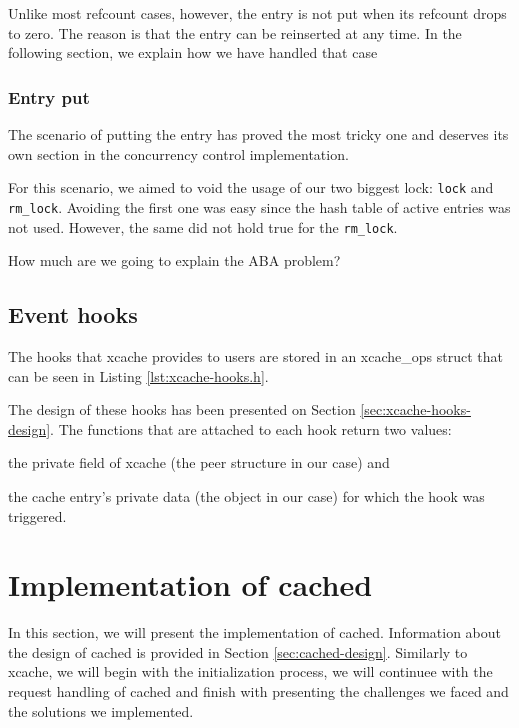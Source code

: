 Unlike most refcount cases, however, the entry is not put when its refcount 
drops to zero. The reason is that the entry can be reinserted at any time. In 
the following section, we explain how we have handled that case

\subsubsection{Entry put}

The scenario of putting the entry has proved the most tricky one and deserves 
its own section in the concurrency control implementation.

For this scenario, we aimed to void the usage of our two biggest lock: 
\texttt{lock} and \texttt{rm\_lock}. Avoiding the first one was easy since the 
hash table of active entries was not used. However, the same did not hold true 
for the \texttt{rm\_lock}.

\fixme How much are we going to explain the ABA problem?

\subsection{Event hooks}

The hooks that xcache provides to users are stored in an xcache\_ops struct 
that can be seen in Listing \ref{lst:xcache-hooks.h}.


The design of these hooks has been presented on Section 
\ref{sec:xcache-hooks-design}. The functions that are attached to each hook 
return two values:
\begin{inparaenum}
\item the private field of xcache (the peer structure in our case) and
\item the cache entry's private data (the object in our case) for which the 
	hook was triggered.
\end{inparaenum}

\section{Implementation of cached}\label{sec:cached-imp}

In this section, we will present the implementation of cached. Information 
about the design of cached is provided in Section \ref{sec:cached-design}.  
Similarly to xcache, we will begin with the initialization process, we will 
continuee with the request handling of cached and finish with presenting the 
challenges we faced and the solutions we implemented.

